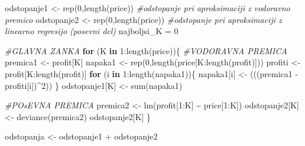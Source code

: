 \documentclass[
]{article}
\newenvironment{Shaded}{\begin{snugshade}}{\end{snugshade}}
\newcommand{\CommentTok}[1]{\textcolor[rgb]{0.56,0.35,0.01}{\textit{#1}}}
\newcommand{\ControlFlowTok}[1]{\textcolor[rgb]{0.13,0.29,0.53}{\textbf{#1}}}
\newcommand{\DecValTok}[1]{\textcolor[rgb]{0.00,0.00,0.81}{#1}}
\newcommand{\FunctionTok}[1]{\textcolor[rgb]{0.00,0.00,0.00}{#1}}
\newcommand{\NormalTok}[1]{#1}
\newcommand{\OtherTok}[1]{\textcolor[rgb]{0.56,0.35,0.01}{#1}}
\newcommand{\SpecialCharTok}[1]{\textcolor[rgb]{0.00,0.00,0.00}{#1}}
\begin{document}
\begin{Shaded}
\begin{Highlighting}[]
\NormalTok{      odstopanje1 }\OtherTok{\textless{}{-}} \FunctionTok{rep}\NormalTok{(}\DecValTok{0}\NormalTok{,}\FunctionTok{length}\NormalTok{(price)) }\CommentTok{\#odstopanje pri aproksimaciji z vodoravno premico}
\NormalTok{      odstopanje2 }\OtherTok{\textless{}{-}} \FunctionTok{rep}\NormalTok{(}\DecValTok{0}\NormalTok{,}\FunctionTok{length}\NormalTok{(price)) }\CommentTok{\#odstopanje pri aproksimaciji z linearno regresijo (posevni del)}
\NormalTok{      najboljsi\_K }\OtherTok{=} \DecValTok{0}
      
      
      \CommentTok{\#GLAVNA ZANKA}
      \ControlFlowTok{for}\NormalTok{ (K }\ControlFlowTok{in} \DecValTok{1}\SpecialCharTok{:}\FunctionTok{length}\NormalTok{(price))\{}
        \CommentTok{\#VODORAVNA PREMICA}
\NormalTok{        premica1 }\OtherTok{\textless{}{-}}\NormalTok{ profit[K]}
\NormalTok{        napaka1 }\OtherTok{\textless{}{-}} \FunctionTok{rep}\NormalTok{(}\DecValTok{0}\NormalTok{,}\FunctionTok{length}\NormalTok{(price[K}\SpecialCharTok{:}\FunctionTok{length}\NormalTok{(profit)]))}
\NormalTok{        profiti }\OtherTok{\textless{}{-}}\NormalTok{ profit[K}\SpecialCharTok{:}\FunctionTok{length}\NormalTok{(profit)]}
        \ControlFlowTok{for}\NormalTok{ (i }\ControlFlowTok{in} \DecValTok{1}\SpecialCharTok{:}\FunctionTok{length}\NormalTok{(napaka1))\{}
\NormalTok{          napaka1[i] }\OtherTok{\textless{}{-}}\NormalTok{ (((premica1 }\SpecialCharTok{{-}}\NormalTok{ profiti[i])}\SpecialCharTok{\^{}}\DecValTok{2}\NormalTok{))}
\NormalTok{        \}}
\NormalTok{        odstopanje1[K] }\OtherTok{\textless{}{-}} \FunctionTok{sum}\NormalTok{(napaka1)}
        
        
        \CommentTok{\#POsEVNA PREMICA}
\NormalTok{        premica2 }\OtherTok{\textless{}{-}} \FunctionTok{lm}\NormalTok{(profit[}\DecValTok{1}\SpecialCharTok{:}\NormalTok{K] }\SpecialCharTok{\textasciitilde{}}\NormalTok{ price[}\DecValTok{1}\SpecialCharTok{:}\NormalTok{K])}
\NormalTok{        odstopanje2[K] }\OtherTok{\textless{}{-}} \FunctionTok{deviance}\NormalTok{(premica2)}
\NormalTok{        odstopanje2[K]}
\NormalTok{      \}}
      
\NormalTok{      odstopanja }\OtherTok{\textless{}{-}}\NormalTok{ odstopanje1 }\SpecialCharTok{+}\NormalTok{ odstopanje2}
      

\end{Highlighting}
\end{Shaded}
\end{document}
